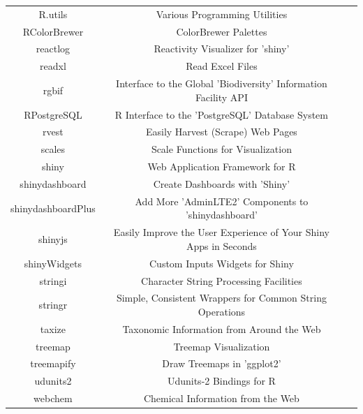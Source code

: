 \documentclass[data,datadescriptor,accept,moreauthors,pdftex]{Definitions/mdpi}
\begin{document}
\begin{table}[H]
\begin{tabular}{ccc}
R.utils & Various Programming Utilities &~\citep{R-R.utils} \\
RColorBrewer & ColorBrewer Palettes &~\citep{R-RColorBrewer} \\
reactlog & Reactivity Visualizer for 'shiny' &~\citep{R-reactlog} \\
readxl & Read Excel Files &~\citep{R-readxl} \\
rgbif & Interface to the Global 'Biodiversity' Information Facility API &~\citep{R-rgbif} \\ RPostgreSQL & R Interface to the 'PostgreSQL' Database System &~\citep{R-RPostgreSQL} \\
rvest & Easily Harvest (Scrape) Web Pages &~\citep{R-rvest} \\
scales & Scale Functions for Visualization &~\citep{R-scales} \\
shiny & Web Application Framework for R &~\citep{R-shiny} \\


shinydashboard & Create Dashboards with 'Shiny' &~\citep{R-shinydashboard} \\
shinydashboardPlus & Add More 'AdminLTE2' Components to 'shinydashboard' &~\citep{R-shinydashboardPlus} \\
shinyjs & Easily Improve the User Experience of Your Shiny Apps in Seconds &~\citep{R-shinyjs} \\ shinyWidgets & Custom Inputs Widgets for Shiny &~\citep{R-shinyWidgets} \\
stringi & Character String Processing Facilities &~\citep{R-stringi} \\
stringr & Simple, Consistent Wrappers for Common String Operations &~\citep{R-stringr} \\
taxize & Taxonomic Information from Around the Web &~\citep{R-taxize} \\
treemap & Treemap Visualization &~\citep{R-treemap} \\
treemapify & Draw Treemaps in 'ggplot2' &~\citep{R-treemapify} \\
udunits2 & Udunits-2 Bindings for R &~\citep{R-udunits2} \\
webchem & Chemical Information from the Web &~\citep{R-webchem} \\
\bottomrule
\end{tabular}
\end{table}
 \unskip
\end{document}
